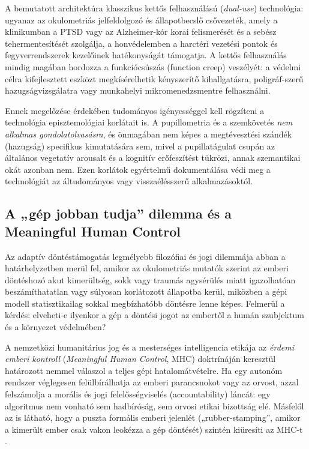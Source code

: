 \documentclass[12pt,a4paper,oneside]{book}
\begin{document}
A bemutatott architektúra klasszikus kettős felhasználású (\emph{dual-use}) technológia: ugyanaz az okulometriás jelfeldolgozó és állapotbecslő csővezeték, amely a klinikumban a PTSD vagy az Alzheimer-kór korai felismerését és a sebész tehermentesítését szolgálja, a honvédelemben a harctéri vezetési pontok és fegyverrendszerek kezelőinek hatékonyságát támogatja. A kettős felhasználás mindig magában hordozza a funkciócsúszás (function creep) veszélyét: a védelmi célra kifejlesztett eszközt megkísérelhetik kényszerítő kihallgatásra, poligráf-szerű hazugságvizsgálatra vagy munkahelyi mikromenedzsmentre felhasználni.

Ennek megelőzése érdekében tudományos igényességgel kell rögzíteni a technológia episztemológiai korlátait is. A pupillometria és a szemkövetés \emph{nem alkalmas gondolatolvasásra}, és önmagában nem képes a megtévesztési szándék (hazugság) specifikus kimutatására sem, mivel a pupillatágulat csupán az általános vegetatív arousalt és a kognitív erőfeszítést tükrözi, annak szemantikai okát azonban nem. Ezen korlátok egyértelmű dokumentálása védi meg a technológiát az áltudományos vagy visszaélésszerű alkalmazásoktól.

\subsection{A „gép jobban tudja” dilemma és a Meaningful Human Control}

Az adaptív döntéstámogatás legmélyebb filozófiai és jogi dilemmája abban a határhelyzetben merül fel, amikor az okulometriás mutatók szerint az emberi döntéshozó akut kimerültség, sokk vagy traumás agysérülés miatt igazolhatóan beszámíthatatlan vagy súlyosan korlátozott állapotba kerül, miközben a gépi modell statisztikailag sokkal megbízhatóbb döntésre lenne képes. Felmerül a kérdés: elveheti-e ilyenkor a gép a döntési jogot az embertől a humán szubjektum és a környezet védelmében?

A nemzetközi humanitárius jog és a mesterséges intelligencia etikája az \emph{érdemi emberi kontroll} (\emph{Meaningful Human Control}, MHC) doktrínáján keresztül határozott nemmel válaszol a teljes gépi hatalomátvételre. Ha egy autonóm rendszer véglegesen felülbírálhatja az emberi parancsnokot vagy az orvost, azzal felszámolja a morális és jogi felelősségviselés (accountability) láncát: egy algoritmus nem vonható sem hadbíróság, sem orvosi etikai bizottság elé. Másfelől az is látható, hogy a puszta formális emberi jelenlét („rubber-stamping”, amikor a kimerült ember csak vakon leokézza a gép döntését) szintén kiüresíti az MHC-t \cite{wang2026}.
\end{document}
